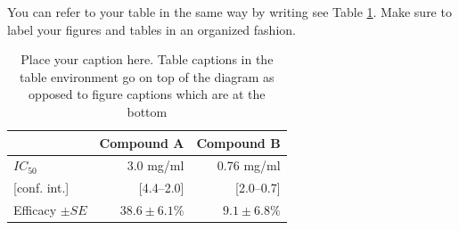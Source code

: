 You can refer to your table in the same way by writing see Table \ref{table:1.1}. Make sure to label your figures and tables in an organized fashion.

\begin{table}[H] %
\centering
\caption{Place your caption here. Table captions in the table environment go on top of the diagram as opposed to figure captions which are at the bottom}
\label{table:1.1}
\begin{tabular}{@{}lrr@{}}
\toprule
 & Compound A & Compound B \\
 \midrule
$IC_{50}$ & 3.0 mg/ml & 0.76 mg/ml \\
{[conf. int.]} & [4.4–2.0] & [2.0–0.7] \\
Efficacy $\pm SE$ & $38.6 \pm 6.1\%$ & $9.1 \pm 6.8\%$ \\ 
\bottomrule
\end{tabular}
\end{table}


